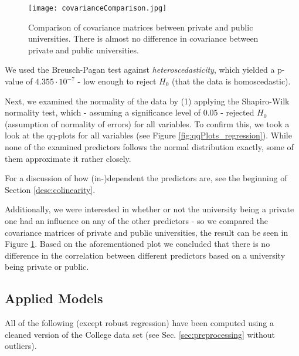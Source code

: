 \documentclass[a4paper]{article}
\begin{document}
\begin{figure}[H]
	\centering
	\texttt{[image: covarianceComparison.jpg]}
	\caption{\label{fig:covariance_regression}Comparison of covariance matrices between private and public universities. There is almost no difference in covariance between private and public universities.}
\end{figure}

We used the Breusch-Pagan test against \emph{heteroscedasticity}, which yielded a p-value of $4.355 \cdot 10^{-7}$ - low enough to reject $H_0$ (that the data is homoscedastic).

Next, we examined the normality of the data by (1) applying the Shapiro-Wilk normality test, which - assuming a significance level of $0.05$ - rejected $H_0$ (assumption of normality of errors)  for all variables. To confirm this, we took a look at the qq-plots for all variables (see Figure \ref{fig:qqPlots_regression}). While none of the examined predictors follows the normal distribution exactly, some of them approximate it rather closely.

For a discussion of how (in-)dependent the predictors are, see the beginning of Section \ref{desc:colinearity}.

Additionally, we were interested in whether or not the university being a private one had an influence on any of the other predictors - so we compared the covariance matrices of private and public universities, the result can be seen in Figure \ref{fig:covariance_regression}. Based on the aforementioned plot we concluded that there is no difference in the correlation between different predictors based on a university being private or public.

\subsection{Applied Models}
All of the following (except robust regression) have been computed using a cleaned version of the College data set (see Sec. \ref{sec:preprocessing} without outliers).
\end{document}

